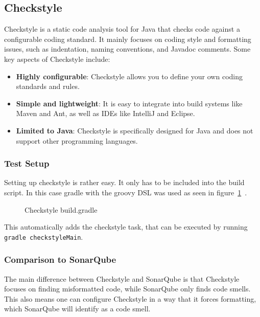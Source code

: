 \subsection{Checkstyle}\label{subsec:checkstyle}
Checkstyle is a static code analysis tool for Java that checks code against a configurable coding standard.
It mainly focuses on coding style and formatting issues, such as indentation, naming conventions, and Javadoc comments.\cite{checkstyle-docs}
Some key aspects of Checkstyle include:

\begin{itemize}
    \item\textbf{Highly configurable}: Checkstyle allows you to define your own coding standards and rules.
    \item\textbf{Simple and lightweight}: It is easy to integrate into build systems like Maven and Ant, as well as IDEs like IntelliJ and Eclipse.
    \item\textbf{Limited to Java}: Checkstyle is specifically designed for Java and does not support other programming languages.
\end{itemize}

\subsubsection{Test Setup}\label{subsubsec:checkstyle-test-setup}
Setting up checkstyle is rather easy.
It only has to be included into the build script.
In this case gradle with the groovy DSL was used as seen in figure\ \ref{fig:checkstyle-gradle}~\cite{gradle-checkstyle}.

\begin{figure}[h]
    \caption{Checkstyle build.gradle}
    
    \label{fig:checkstyle-gradle}
\end{figure}

This automatically adds the checkstyle task, that can be executed by running \texttt{gradle checkstyleMain}.

\subsubsection{Comparison to SonarQube}
The main difference between Checkstyle and SonarQube is that Checkstyle focuses on finding misformatted code, while SonarQube only finds code smells.
This also means one can configure Checkstyle in a way that it forces formatting, which SonarQube will identify as a code smell.

